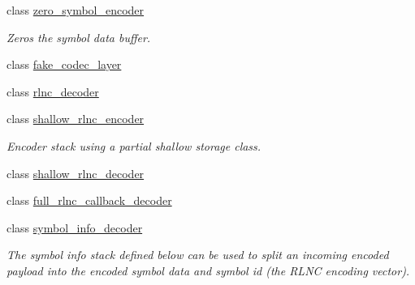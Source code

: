 \begin{DoxyCompactItemize}
class \hyperlink{classkodo_1_1zero__symbol__encoder}{zero\-\_\-symbol\-\_\-encoder}
\begin{DoxyCompactList}\small\item\em Zeros the symbol data buffer. \end{DoxyCompactList}\item 
class \hyperlink{classkodo_1_1fake__codec__layer}{fake\-\_\-codec\-\_\-layer}
\item 
class \hyperlink{classkodo_1_1rlnc__decoder}{rlnc\-\_\-decoder}
\item 
class \hyperlink{classkodo_1_1shallow__rlnc__encoder}{shallow\-\_\-rlnc\-\_\-encoder}
\begin{DoxyCompactList}\small\item\em Encoder stack using a partial shallow storage class. \end{DoxyCompactList}\item 
class \hyperlink{classkodo_1_1shallow__rlnc__decoder}{shallow\-\_\-rlnc\-\_\-decoder}
\item 
class \hyperlink{classkodo_1_1full__rlnc__callback__decoder}{full\-\_\-rlnc\-\_\-callback\-\_\-decoder}
\item 
class \hyperlink{classkodo_1_1symbol__info__decoder}{symbol\-\_\-info\-\_\-decoder}
\begin{DoxyCompactList}\small\item\em The symbol info stack defined below can be used to split an incoming encoded payload into the encoded symbol data and symbol id (the R\-L\-N\-C encoding vector). \end{DoxyCompactList}\end{DoxyCompactItemize}
